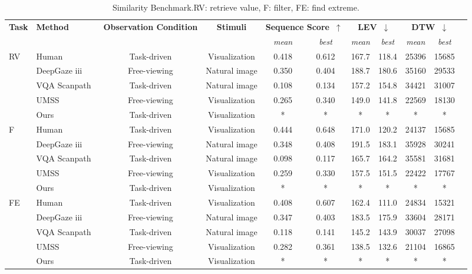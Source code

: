 \begin{table}[ht]
\centering
\caption{Similarity Benchmark.RV: retrieve value, F: filter, FE: find extreme.}
\begin{tabular}{llccccccccc}
\toprule
\multirow{2}{*}{\textbf{Task}} & \multirow{2}{*}{\textbf{Method}} & \multirow{2}{*}{\textbf{Observation Condition}} & \multirow{2}{*}{\textbf{Stimuli}} & \multicolumn{2}{c}{\textbf{Sequence Score~$\uparrow$}} & \multicolumn{2}{c}{\textbf{LEV~$\downarrow$}} & \multicolumn{2}{c}{\textbf{DTW~$\downarrow$}} \\
& & & & \textit{mean} & \textit{best} & \textit{mean} & \textit{best} & \textit{mean} & \textit{best} \\
\midrule 
\multirow{5}{*}{RV}& Human & Task-driven & Visualization & 0.418 & 0.612 & 167.7 & 118.4 & 25396 & 15685 \\
\cmidrule{2-10}
& DeepGaze iii~\cite{kummerer2022deepgaze} & Free-viewing & Natural image & 0.350 & 0.404 & 188.7 & 180.6 & 35160 & 29533 \\
& VQA Scanpath~\cite{chen2021predicting} & Task-driven & Natural image & 0.108 & 0.134 & 157.2 & 154.8 & 34421 & 31007 \\
& UMSS~\cite{wang2023scanpath} & Free-viewing & Visualization & 0.265 & 0.340 & 149.0 & 141.8 & 22569 & 18130 \\
& Ours & Task-driven & Visualization & * & * & * & * & * & *\\
\midrule 
\multirow{5}{*}{F} & Human & Task-driven & Visualization & 0.444 & 0.648 & 171.0 & 120.2 & 24137 & 15685 \\
\cmidrule{2-10}
& DeepGaze iii~\cite{kummerer2022deepgaze} & Free-viewing & Natural image & 0.348 & 0.408 & 191.5 & 183.1 & 35928 & 30241 \\
& VQA Scanpath~\cite{chen2021predicting} & Task-driven & Natural image & 0.098 & 0.117 & 165.7 & 164.2 & 35581 & 31681 \\
& UMSS~\cite{wang2023scanpath} & Free-viewing & Visualization & 0.259 & 0.330 & 157.5 & 151.5 & 22422 & 17767 \\
& Ours & Task-driven & Visualization & * & * & * & * & * & *\\
\midrule 
\multirow{5}{*}{FE}& Human & Task-driven & Visualization & 0.408 & 0.607 & 162.4 & 111.0 & 24834 & 15321 \\
\cmidrule{2-10}
&DeepGaze iii~\cite{kummerer2022deepgaze} & Free-viewing & Natural image & 0.347 & 0.403 & 183.5 & 175.9 & 33604 & 28171 \\
&VQA Scanpath~\cite{chen2021predicting} & Task-driven & Natural image & 0.118 & 0.141 & 145.2 & 143.9 & 30037 & 27098 \\
&UMSS~\cite{wang2023scanpath} & Free-viewing & Visualization & 0.282 & 0.361 & 138.5 & 132.6 & 21104 & 16865 \\
& Ours & Task-driven & Visualization & * & * & * & * & * & * \\
\bottomrule
\end{tabular}
\label{tab:scanpath_benchmark}
\end{table}
